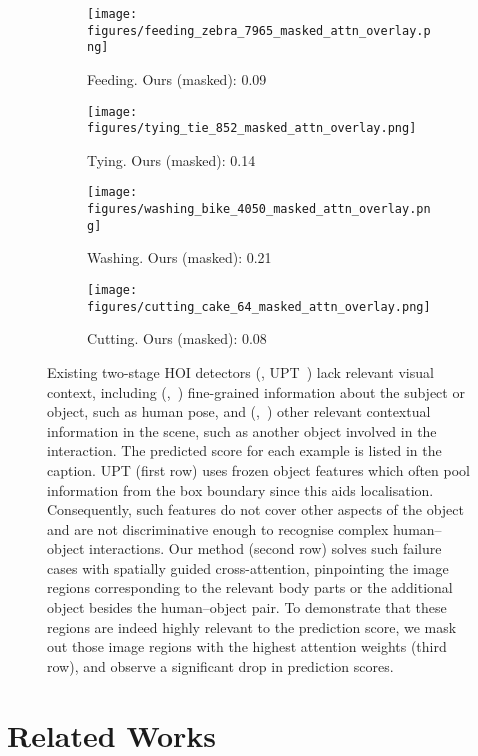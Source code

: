 \documentclass[10pt,twocolumn,letterpaper]{article}
\begin{document}
\begin{figure*}[t]
\begin{subfigure}[t]{0.245\linewidth}
      \texttt{[image: figures/feeding\_zebra\_7965\_masked\_attn\_overlay.png]}
      \caption{Feeding. Ours (masked): 0.09}
      \label{fig:comp_1_blocked_ours}
   \end{subfigure}\hfill
   \begin{subfigure}[t]{0.245\linewidth}
      \texttt{[image: figures/tying\_tie\_852\_masked\_attn\_overlay.png]}
      \caption{Tying. Ours (masked): 0.14}
      \label{fig:comp_3_blocked_ours}
   \end{subfigure}\hfill
   \begin{subfigure}[t]{0.245\linewidth}
      \centering
      \texttt{[image: figures/washing\_bike\_4050\_masked\_attn\_overlay.png]}
      \caption{Washing. Ours (masked): 0.21}
      \label{fig:comp_2_blocked_ours}
   \end{subfigure}\hfill
   \begin{subfigure}[t]{0.245\linewidth}
      \texttt{[image: figures/cutting\_cake\_64\_masked\_attn\_overlay.png]}
      \caption{Cutting. Ours (masked): 0.08}
      \label{fig:comp_4_blocked_ours}
   \end{subfigure}\vspace{5px}
   \caption{
   	Existing two-stage HOI detectors (\eg, UPT~\cite{upt}) lack relevant visual context, including (,~) fine-grained information about the subject or object, such as human pose, and (,~) other relevant contextual information in the scene, such as another object involved in the interaction. The predicted score for each example is listed in the caption. UPT (first row) uses frozen object features which often pool information from the box boundary since this aids localisation. Consequently, such features do not cover other aspects of the object and are not discriminative enough to recognise complex human--object interactions. Our method (second row) solves such failure cases with spatially guided cross-attention, pinpointing the image regions corresponding to the relevant body parts or the additional object besides the human--object pair. To demonstrate that these regions are indeed highly relevant to the prediction score, we mask out those image regions with the highest attention weights (third row), and observe a significant drop in prediction scores.}
   \label{fig:comp}
\end{figure*}

\section{Related Works}
\end{document}
